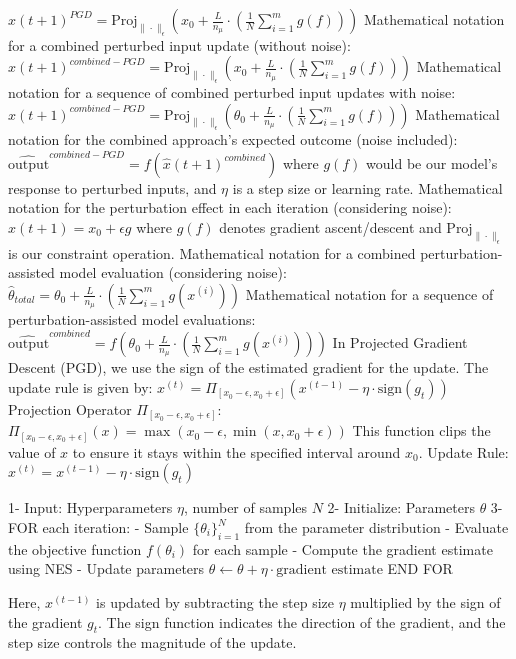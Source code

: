 $\hat{x}(t+1)^{PGD} = \text{Proj}_{\|\cdot\|_{\epsilon}} \left( x_0 + \frac{L}{n_\mu} \cdot \left( \frac{1}{N} \sum_{i=1}^{m} g(f) \right) \right)$
Mathematical notation for a combined perturbed input update (without noise):
$\hat{x}(t+1)^{combined-PGD} = \text{Proj}_{\|\cdot\|_{\epsilon}} \left( x_0 + \frac{L}{n_\mu} \cdot \left( \frac{1}{N} \sum_{i=1}^{m} g(f) \right) \right)$
Mathematical notation for a sequence of combined perturbed input updates with noise:
$\hat{x}(t+1)^{combined-PGD} = \text{Proj}_{\|\cdot\|_{\epsilon}} \left( \theta_0 + \frac{L}{n_\mu} \cdot \left( \frac{1}{N} \sum_{i=1}^{m} g(f) \right) \right)$
Mathematical notation for the combined approach's expected outcome (noise included):
$\hat{\text{output}}^{combined-PGD} = f \left( \hat{x}(t+1)^{combined} \right)$
where $g(f)$ would be our model’s response to perturbed inputs, and $\eta$ is a step size or learning rate.
Mathematical notation for the perturbation effect in each iteration (considering noise):
$\hat{x}(t+1) = x_0 + \epsilon g$
where $g(f)$ denotes gradient ascent/descent and $\text{Proj}_{\|\cdot\|_{\epsilon}}$ is our constraint operation.
Mathematical notation for a combined perturbation-assisted model evaluation (considering noise):
$\hat{\theta}_{total} = \theta_0 + \frac{L}{n_\mu} \cdot \left( \frac{1}{N} \sum_{i=1}^{m} g(x^{(i)}) \right)$
Mathematical notation for a sequence of perturbation-assisted model evaluations:
$\hat{\text{output}}^{combined} = f \left( \theta_0 + \frac{L}{n_\mu} \cdot \left( \frac{1}{N} \sum_{i=1}^{m} g(x^{(i)}) \right) \right)$
In Projected Gradient Descent (PGD), we use the sign of the estimated gradient for the update. The update rule is given by:
$x^{(t)} = \Pi_{[x_0 - \epsilon, x_0 + \epsilon]} \left( x^{(t-1)} - \eta \cdot \text{sign}(g_t) \right)$
Projection Operator $ \Pi_{[x_0 - \epsilon, x_0 + \epsilon]} $:
$\Pi_{[x_0 - \epsilon, x_0 + \epsilon]}(x) = \max \left( x_0 - \epsilon, \min \left( x, x_0 + \epsilon \right) \right)$
This function clips the value of $ x $ to ensure it stays within the specified interval around $ x_0 $.
Update Rule:
$x^{(t)} = x^{(t-1)} - \eta \cdot \text{sign}(g_t)$

1- Input: Hyperparameters $\eta$, number of samples $N$
2- Initialize: Parameters $\theta$
3- FOR each iteration:
    - Sample $\{ \theta_i \}_{i=1}^N$ from the parameter distribution
    - Evaluate the objective function $f(\theta_i)$ for each sample
    - Compute the gradient estimate using NES
    - Update parameters $\theta \leftarrow \theta + \eta \cdot \text{gradient estimate}$ 
    END FOR

Here, $ x^{(t-1)} $ is updated by subtracting the step size $ \eta $ multiplied by the sign of the gradient $ g_t $. The sign function indicates the direction of the gradient, and the step size controls the magnitude of the update.